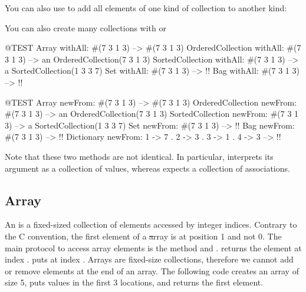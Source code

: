 \documentclass[a4paper,10pt,twoside]{book}
\begin{document}
You can also use  to add all elements of one kind of collection to another kind:


You can also create many collections with  or 

\begin{code}{@TEST}
Array withAll: #(7 3 1 3)                      --> #(7 3 1 3)
OrderedCollection withAll: #(7 3 1 3) --> an OrderedCollection(7 3 1 3)
SortedCollection withAll: #(7 3 1 3)    --> a SortedCollection(1 3 3 7)
Set withAll: #(7 3 1 3)                         --> !!
Bag withAll: #(7 3 1 3)                        --> !!
\end{code}

\begin{code}{@TEST}
Array newFrom: #(7 3 1 3)                                          --> #(7 3 1 3)
OrderedCollection newFrom: #(7 3 1 3)                     --> an OrderedCollection(7 3 1 3)
SortedCollection newFrom: #(7 3 1 3)                       --> a SortedCollection(1 3 3 7)
Set newFrom: #(7 3 1 3)                                            --> !!
Bag newFrom: #(7 3 1 3)                                           --> !!
Dictionary newFrom: {1 -> 7 . 2 -> 3 . 3 -> 1 . 4 -> 3} --> !!
\end{code}
\noindent
Note that these two methods are not identical.
In particular,  interprets its argument as a collection of values, whereas  expects a collection of associations.

\subsection{Array}
An  is a fixed-sized collection of elements accessed by integer indices.
Contrary to the C convention, the first element of a \st array is at position 1 and not 0.
The main protocol to access array elements is the method  and .
 returns the element at index .
 puts  at index .
Arrays are fixed-size collections, therefore we cannot add or remove elements at the end of an array.
The following code creates an array of size 5, puts values in the first 3 locations, and returns the first element.
\end{document}
